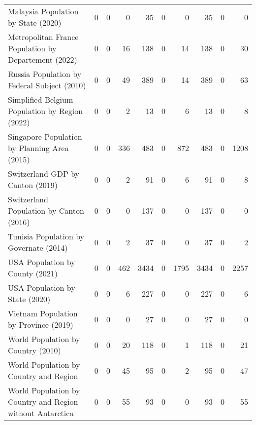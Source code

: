 \begin{tabular}{lrrr|rrr|rrr}
Malaysia Population by State (2020) & 0 & 0 & 0 & 35 & 0 & 0 & 35 & 0 & 0 \\
Metropolitan France Population by Departement (2022) & 0 & 0 & 16 & 138 & 0 & 14 & 138 & 0 & 30 \\
Russia Population by Federal Subject (2010) & 0 & 0 & 49 & 389 & 0 & 14 & 389 & 0 & 63 \\
Simplified Belgium Population by Region (2022) & 0 & 0 & 2 & 13 & 0 & 6 & 13 & 0 & 8 \\
Singapore Population by Planning Area (2015) & 0 & 0 & 336 & 483 & 0 & 872 & 483 & 0 & 1208 \\
Switzerland GDP by Canton (2019) & 0 & 0 & 2 & 91 & 0 & 6 & 91 & 0 & 8 \\
Switzerland Population by Canton (2016) & 0 & 0 & 0 & 137 & 0 & 0 & 137 & 0 & 0 \\
Tunisia Population by Governate (2014) & 0 & 0 & 2 & 37 & 0 & 0 & 37 & 0 & 2 \\
USA Population by County (2021) & 0 & 0 & 462 & 3434 & 0 & 1795 & 3434 & 0 & 2257 \\
USA Population by State (2020) & 0 & 0 & 6 & 227 & 0 & 0 & 227 & 0 & 6 \\
Vietnam Population by Province (2019) & 0 & 0 & 0 & 27 & 0 & 0 & 27 & 0 & 0 \\
World Population by Country (2010) & 0 & 0 & 20 & 118 & 0 & 1 & 118 & 0 & 21 \\
World Population by Country and Region & 0 & 0 & 45 & 95 & 0 & 2 & 95 & 0 & 47 \\
World Population by Country and Region without Antarctica & 0 & 0 & 55 & 93 & 0 & 0 & 93 & 0 & 55 \\
\bottomrule
\end{tabular}
